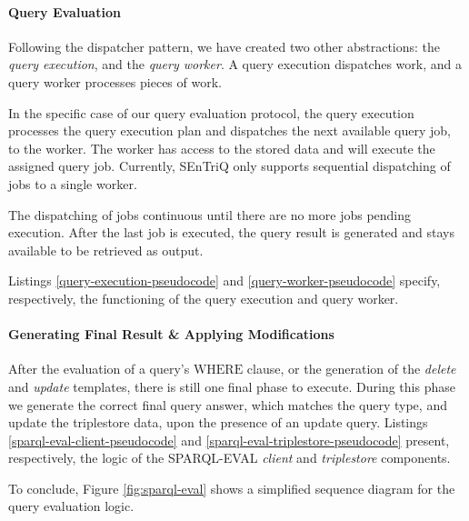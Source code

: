\paragraph{Query Evaluation} Following the dispatcher pattern, we have created two other abstractions: the \emph{query execution}, and the \emph{query worker}. A query execution dispatches work, and a query worker processes pieces of work.

In the specific case of our query evaluation protocol, the query execution processes the query execution plan and dispatches the next available query job, to the worker. The worker has access to the stored data and will execute the assigned query job. Currently, \gls{SEnTriQ} only supports sequential dispatching of jobs to a single worker.

The dispatching of jobs continuous until there are no more jobs pending execution. After the last job is executed, the query result is generated and stays available to be retrieved as output.

Listings \ref{query-execution-pseudocode} and \ref{query-worker-pseudocode} specify, respectively, the functioning of the query execution and query worker.

%

%

\paragraph{Generating Final Result \& Applying Modifications} After the evaluation of a query's $\textrm{WHERE}$ clause, or the generation of the \emph{delete} and \emph{update} templates, there is still one final phase to execute. During this phase we generate the correct final query answer, which matches the query type, and update the triplestore data, upon the presence of an update query. Listings \ref{sparql-eval-client-pseudocode} and \ref{sparql-eval-triplestore-pseudocode} present, respectively, the logic of the SPARQL-EVAL \emph{client} and \emph{triplestore} components.

To conclude, Figure \ref{fig:sparql-eval} shows a simplified sequence diagram for the query evaluation logic.

%

